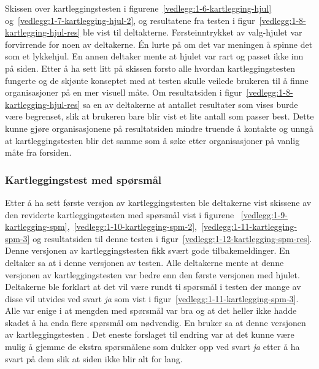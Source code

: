 Skissen over kartleggingstesten i figurene~\ref{vedlegg:1-6-kartlegging-hjul} og~\ref{vedlegg:1-7-kartlegging-hjul-2}, og resultatene fra testen i figur~\ref{vedlegg:1-8-kartlegging-hjul-res} ble vist til deltakterne. Førsteinntrykket av valg-hjulet var forvirrende for noen av deltakerne. Én lurte på om det var meningen å spinne det som et lykkehjul. En annen deltaker mente at hjulet var rart og passet ikke inn på siden. Etter å ha sett litt på skissen forsto alle hvordan kartleggingstesten fungerte og de skjønte konseptet med at testen skulle veilede brukeren til å finne organisasjoner på en mer visuell måte. Om resultatsiden i figur~\ref{vedlegg:1-8-kartlegging-hjul-res} sa en av deltakerne at antallet resultater som vises burde være begrenset, slik at brukeren bare blir vist et lite antall som passer best. Dette kunne gjøre organisasjonene på resultatsiden mindre truende å kontakte og unngå at kartleggingstesten blir det samme som å søke etter organisasjoner på vanlig måte fra forsiden.


\subsubsection{Kartleggingstest med spørsmål}
\label{section:test-kartlegging-spm1.0}

Etter å ha sett første versjon av kartleggingstesten ble deltakerne vist skissene av den reviderte kartleggingstesten med spørsmål vist i figurene ~\ref{vedlegg:1-9-kartlegging-spm},~\ref{vedlegg:1-10-kartlegging-spm-2},~\ref{vedlegg:1-11-kartlegging-spm-3} og resultatsiden til denne testen i figur~\ref{vedlegg:1-12-kartlegging-spm-res}. Denne versjonen av kartleggingstesten fikk svært gode tilbakemeldinger. En deltaker sa at  i denne versjonen av testen. Alle deltakerne mente at denne versjonen av kartleggingstesten var bedre enn den første versjonen med hjulet. Deltakerne ble forklart at det vil være rundt ti spørsmål i testen der mange av disse vil utvides ved svart {\em  ja} som vist i figur~\ref{vedlegg:1-11-kartlegging-spm-3}. Alle var enige i at mengden med spørsmål var bra og at det heller ikke hadde skadet å ha enda flere spørsmål om nødvendig. En bruker sa at denne versjonen av kartleggingstesten . Det eneste forslaget til endring var at det kunne være mulig å gjemme de ekstra spørsmålene som dukker opp ved svart {\em  ja} etter å ha svart på dem slik at siden ikke blir alt for lang.


